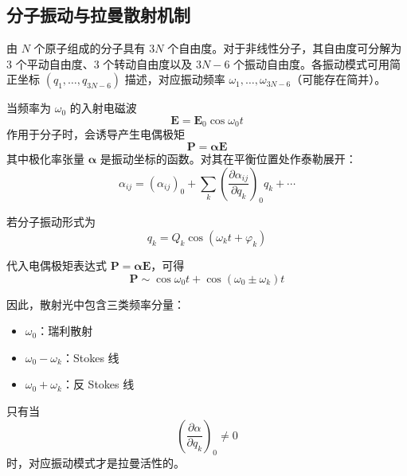 \documentclass[a4paper]{ctexart}
\begin{document}
        \subsection{分子振动与拉曼散射机制}

            由 $N$ 个原子组成的分子具有 $3N$ 个自由度。对于非线性分子，其自由度可分解为 3 个平动自由度、3 个转动自由度以及 $3N-6$ 个振动自由度。各振动模式可用简正坐标 $(q_1,\dots,q_{3N-6})$ 描述，对应振动频率 $\omega_1,\dots,\omega_{3N-6}$（可能存在简并）。

            当频率为 $\omega_0$ 的入射电磁波
            \begin{equation}
                \mathbf{E} = \mathbf{E}_0 \cos \omega_0 t
            \end{equation}
            作用于分子时，会诱导产生电偶极矩
            \begin{equation}
                \mathbf{P} = \boldsymbol{\alpha}\mathbf{E}
            \end{equation}
            其中极化率张量 $\boldsymbol{\alpha}$ 是振动坐标的函数。对其在平衡位置处作泰勒展开：
            \begin{equation}
                \alpha_{ij} = (\alpha_{ij})_0 + \sum_{k}\left(\frac{\partial \alpha_{ij}}{\partial q_k}\right)_0 q_k + \cdots
            \end{equation}

            若分子振动形式为
            \begin{equation}
                q_k = Q_k \cos(\omega_k t + \varphi_k)
            \end{equation}

            代入电偶极矩表达式 $\mathbf{P} = \boldsymbol{\alpha}\mathbf{E}$，可得
            \begin{equation}
                \mathbf{P} \sim \cos \omega_0 t + \cos(\omega_0 \pm \omega_k)t
            \end{equation}

            因此，散射光中包含三类频率分量：
            \begin{itemize}
                \item $\omega_0$：瑞利散射
                \item $\omega_0 - \omega_k$：Stokes 线
                \item $\omega_0 + \omega_k$：反 Stokes 线
            \end{itemize}

            只有当
            \begin{equation}
                \left(\frac{\partial \alpha}{\partial q_k}\right)_0 \neq 0
            \end{equation}
            时，对应振动模式才是拉曼活性的。
\end{document}
